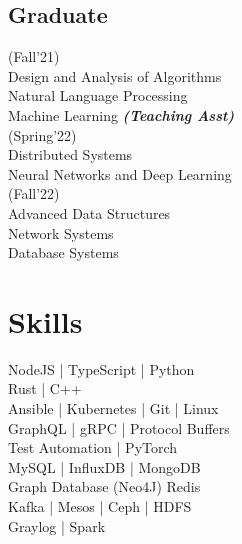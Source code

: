 \documentclass[]{deedy-resume-openfont}
\begin{document}
\begin{minipage}[t]{0.33\textwidth}
\subsection{Graduate}
\vspace{1em}
(Fall'21)\\
\textbullet{} Design and Analysis of Algorithms \\
\textbullet{} Natural Language Processing \\
\textbullet{} Machine Learning
{\footnotesize \textit{\textbf{(Teaching Asst) }}}
\vspace{1em}
\\(Spring'22)\\
\textbullet{} Distributed Systems \\
\textbullet{} Neural Networks and Deep Learning \\
\vspace{1em}
(Fall'22)\\
\textbullet{} Advanced Data Structures \\
\textbullet{} Network Systems \\
\textbullet{} Database Systems
\sectionsep


\section{Skills}
\textbullet{} NodeJS | TypeScript | Python \\
\textbullet{} Rust | C++  \\
\vspace{1em}
\textbullet{} Ansible | Kubernetes | Git | Linux\\
\textbullet{} GraphQL | gRPC | Protocol Buffers \\
\textbullet{} Test Automation | PyTorch \\
\vspace{1em}
\textbullet{} MySQL | InfluxDB | MongoDB \\
\textbullet{} Graph Database (Neo4J) \textbullet{} Redis \\
\vspace{1em}
\textbullet{} Kafka | Mesos | Ceph | HDFS \\
\textbullet{} Graylog | Spark \\
\sectionsep

%
%

\end{minipage} 
\end{document}
